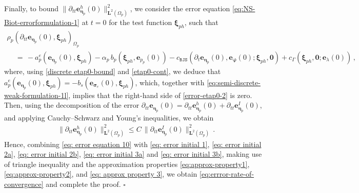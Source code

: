 \documentclass[11pt]{article}
\numberwithin{equation}{section}
\newcommand{\ds}{\displaystyle}
\newcommand{\bbeta}{{\boldsymbol\eta}}
\newcommand{\bsi}{{\boldsymbol\sigma}}
\newcommand{\bvarphi}{{\boldsymbol\varphi}}
\newcommand{\bxi}{{\boldsymbol\xi}}
\newcommand{\be}{{\mathbf{e}}}
\newcommand{\0}{{\mathbf{0}}}
\newcommand{\bL}{\mathbf{L}}
\def\BJS{\mathtt{BJS}}
\newenvironment{proof}{\noindent{\it Proof.}}{\hfill$\square$}
\numberwithin{equation}{section}
\begin{document}
\begin{proof}
Finally, to bound $\|\partial_{tt}\be_{\bbeta_p}^h(0)\|^2_{\bL^2(\Omega_p)}$, we consider the error equation \eqref{eq:NS-Biot-errorformulation-1} at $t=0$ for the test function $\bxi_{ph}$, such that
\begin{equation}\label{error-etap0-2}
\begin{array}{l}
\ds\rho_p(\partial_{tt}\be_{\bbeta_p}(0),\bxi_{ph})_{\Omega_p} \\[1ex] 
\ds\quad \,=\, - a^e_p(\be_{\bbeta_p}(0),\bxi_{ph})
- \alpha_p\,b_p(\bxi_{ph},\be_{p_p}(0))  
- c_{\BJS}(\partial_t\be_{\bbeta_p}(0), \be_{\bvarphi}(0);\bxi_{ph}, \0)
+ c_{\Gamma}(\bxi_{ph},\0;\be_{\lambda}(0)) \,, 
\end{array}
\end{equation}
where, using \eqref{discrete etap0-bound} and \eqref{etap0-cont}, we deduce that $a^e_p(\be_{\bbeta_p}(0),\bxi_{ph}) = -b_s(\be_{\bsi_e}(0),\bxi_{ph})$, which, together with \eqref{eq:semi-discrete-weak-formulation-1l}, implies that the right-hand side of \eqref{error-etap0-2} is zero. Then, using the decomposition of the error $\partial_{tt}\be_{\bbeta_p}(0) = \partial_{tt}\be^h_{\bbeta_p}(0) + \partial_{tt}\be^I_{\bbeta_p}(0)$, and applying Cauchy–Schwarz and Young's inequalities, we obtain
%
%
\begin{align}\label{eq: error initial 3b}
& \|\partial_{tt}\be_{\bbeta_p}^h(0)\|^2_{\bL^2(\Omega_p)}  
\leq C\,\|\partial_{tt}\be_{\bbeta_p}^I(0)\|^2_{\bL^2(\Omega_p)} \,.
\end{align}
%
Hence, combining \eqref{eq: error equation 10} with \eqref{eq: error initial 1}, \eqref{eq: error initial 2a}, \eqref{eq: error initial 2b}, \eqref{eq: error initial 3a} and \eqref{eq: error initial 3b}, making use of triangle inequality and the approximation properties \eqref{eq:approx-property1}, \eqref{eq:approx-property2}, and \eqref{eq: approx property 3}, we obtain \eqref{eq:errror-rate-of-convergence} and complete the proof.
\end{proof}

\end{document}

